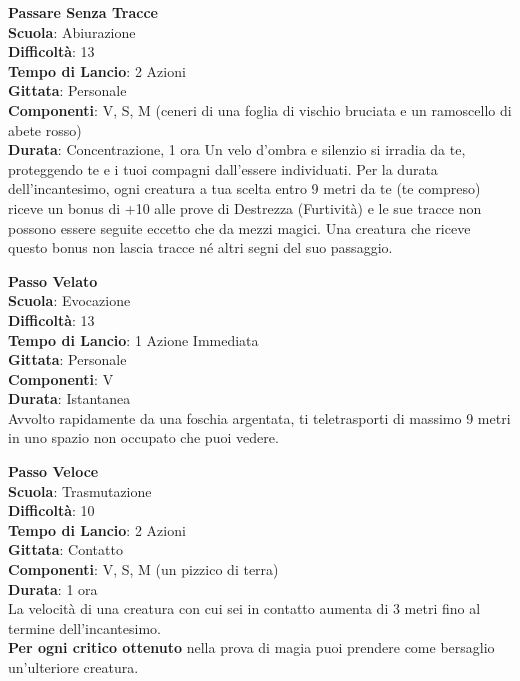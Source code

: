\begin{multicols}{2}
\medskip\textbf{Passare Senza Tracce}\\
\textbf{Scuola}: Abiurazione\\
\textbf{Difficoltà}:  13\\
\textbf{Tempo di Lancio}: 2 Azioni\\
\textbf{Gittata}: Personale\\
\textbf{Componenti}: V, S, M (ceneri di una foglia di vischio bruciata e un ramoscello di abete rosso)\\
\textbf{Durata}: Concentrazione, 1 ora
Un velo d’ombra e silenzio si irradia da te, proteggendo te e i tuoi compagni dall'essere individuati. Per la durata dell'incantesimo, ogni creatura a tua scelta entro 9 metri da te (te compreso) riceve un bonus di +10 alle prove di Destrezza (Furtività) e le sue tracce non possono essere seguite eccetto che da mezzi magici. Una creatura che riceve questo bonus non lascia tracce né altri segni del suo passaggio.

\medskip\textbf{Passo Velato}\\
\textbf{Scuola}: Evocazione\\
\textbf{Difficoltà}:  13\\
\textbf{Tempo di Lancio}: 1 Azione Immediata\\
\textbf{Gittata}: Personale\\
\textbf{Componenti}: V\\
\textbf{Durata}: Istantanea\\
Avvolto rapidamente da una foschia argentata, ti teletrasporti di massimo 9 metri in uno spazio non occupato che puoi vedere.

\medskip\textbf{Passo Veloce}\\
\textbf{Scuola}: Trasmutazione\\
\textbf{Difficoltà}:  10\\
\textbf{Tempo di Lancio}: 2 Azioni\\
\textbf{Gittata}: Contatto\\
\textbf{Componenti}: V, S, M (un pizzico di terra)\\
\textbf{Durata}: 1 ora\\
La velocità di una creatura con cui sei in contatto aumenta di 3 metri fino al termine dell'incantesimo. \\
\textbf{Per ogni critico ottenuto} nella prova di magia puoi prendere come bersaglio un'ulteriore creatura.


\end{multicols}
